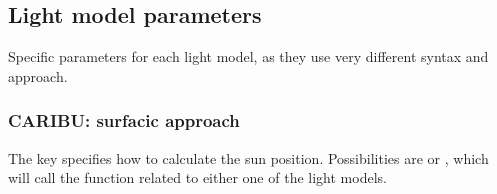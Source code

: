 \documentclass[letterpaper,10pt,english]{sphinxmanual}
\begin{document}
\subsection{Light model parameters}
\label{\detokenize{inputs:light-model-parameters}}
\sphinxAtStartPar
Specific parameters for each light model, as they use very different syntax and approach.


\subsubsection{CARIBU: surfacic approach}
\label{\detokenize{inputs:caribu-surfacic-approach}}\label{\detokenize{inputs:caribuparam}}
\begin{sphinxVerbatim}[commandchars=\\\{\}]
  
                      
                      

                      
                                       
                                       
                      
                      
                      \PYG{p}{[}     \PYG{p}{]}
\end{sphinxVerbatim}

\sphinxAtStartPar
The key  specifies how to calculate the sun position. Possibilities are  or , which will call the function related to either one of the light models.
\end{document}

